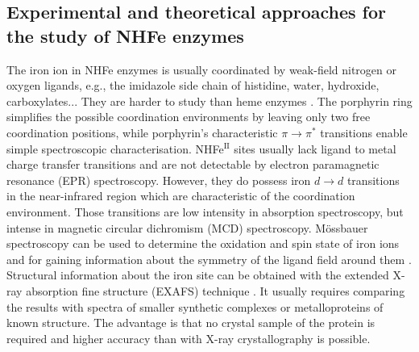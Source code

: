 \subsection{Experimental and theoretical approaches for the study of NHFe enzymes}
The iron ion in NHFe enzymes is usually coordinated by weak-field nitrogen or oxygen ligands, e.g., the imidazole side chain of histidine, water, hydroxide, carboxylates... They are harder to study than heme enzymes \cite{Solomon2003}. The porphyrin ring simplifies the possible coordination environments by leaving only two free coordination positions, while porphyrin's characteristic $\pi \rightarrow \pi^{*}$ transitions enable simple spectroscopic characterisation. NHFe$^{\mathrm{II}}$ sites usually lack ligand to metal charge transfer transitions and are not detectable by electron paramagnetic resonance (EPR) spectroscopy. However, they do possess iron $d \rightarrow d$ transitions in the near-infrared region which are characteristic of the coordination environment. Those transitions are low intensity in absorption spectroscopy, but intense in magnetic circular dichromism (MCD) spectroscopy. M\"ossbauer spectroscopy can be used to determine the oxidation and spin state of iron ions and for gaining information about the symmetry of the ligand field around them \cite{Crichton2016_essential_role_iron}. Structural information about the iron site can be obtained  with the extended X-ray absorption fine structure (EXAFS) technique \cite{Feiters2013}. It usually requires comparing the results with spectra of smaller synthetic complexes or metalloproteins of known structure. The advantage is that no crystal sample of the protein is required and higher accuracy than with X-ray crystallography is possible.

